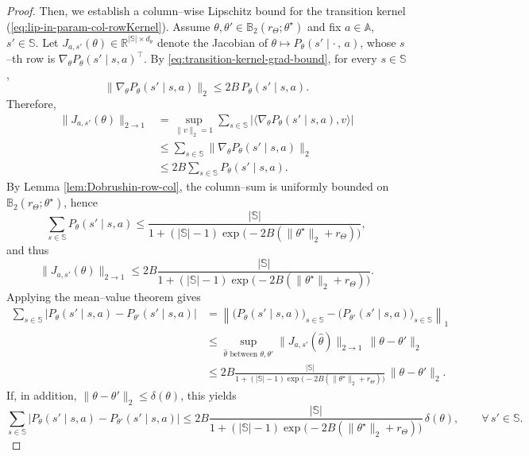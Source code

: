 \documentclass[10pt]{article} %
\theoremstyle{plain}
\theoremstyle{definition}
\theoremstyle{remark}
\newcommand{\bA}{\mathbb{A}}
\newcommand{\bB}{\mathbb{B}}
\newcommand{\bR}{\mathbb{R}}
\newcommand{\bS}{\mathbb{S}}
\begin{document}
\begin{proof}
\medskip
\noindent
Then, we establish a column–wise Lipschitz bound for the transition kernel (\ref{eq:lip-in-param-col-rowKernel}). Assume $\theta,\theta'\in\bB_2(r_\Theta;\theta^\star)$ and fix
$a\in\bA$, $s'\in\bS$. Let $J_{a,s'}(\theta)\in\bR^{|\bS|\times d_\theta}$ denote the Jacobian of $\theta \mapsto P_\theta(s'\mid \cdot\,,\, a)$, whose $s$–th row is
$\nabla_\theta P_\theta(s'\mid s,a)^\top$. By \ref{eq:transition-kernel-grad-bound}, for every $s\in\bS$,
\[
\big\|\nabla_\theta P_\theta(s'\mid s,a)\big\|_2
\le 2B\,P_\theta(s'\mid s,a).
\]
Therefore,
\begin{align*}
\|J_{a,s'}(\theta)\|_{2\to1}
&=\sup_{\|v\|_2=1}
  \sum_{s\in\bS}\big|\langle\nabla_\theta P_\theta(s'\mid s,a),v\rangle\big|\\
&\le \sum_{s\in\bS}\big\|\nabla_\theta P_\theta(s'\mid s,a)\big\|_2\\
&\le 2B\sum_{s\in\bS}P_\theta(s'\mid s,a).
\end{align*}
By Lemma \ref{lem:Dobrushin-row-col}, the column–sum is uniformly bounded on $\bB_2(r_\Theta;\theta^\star)$, hence
\[
\sum_{s\in\bS}P_\theta(s'\mid s,a)
\le
\frac{|\bS|}
{1+(|\bS|-1)\exp\bigl(-2B(\|\theta^\star\|_2+r_\Theta)\bigr)},
\]
and thus
\[
\|J_{a,s'}(\theta)\|_{2\to1}
\le
2B\frac{|\bS|}
{1+(|\bS|-1)\exp\bigl(-2B(\|\theta^\star\|_2+r_\Theta)\bigr)}.
\]
Applying the mean–value theorem gives
\begin{align*}
\sum_{s\in\bS}\big|P_\theta(s'\mid s,a)-P_{\theta'}(s'\mid s,a)\big|
&=\left\|\big(P_\theta(s'\mid s,a)\big)_{s\in\bS}
-\big(P_{\theta'}(s'\mid s,a)\big)_{s\in\bS}
\right\|_1\\
&\le \sup_{\hat\theta\text{ between }\theta,\theta'}
\|J_{a,s'}(\hat\theta)\|_{2\to1}\,\|\theta-\theta'\|_2\\
&\le
2B\frac{|\bS|}
{1+(|\bS|-1)\exp\bigl(-2B(\|\theta^\star\|_2+r_\Theta)\bigr)}
\,\|\theta-\theta'\|_2.
\end{align*}
If, in addition, $\|\theta-\theta'\|_2\le\delta(\theta)$, this yields
\[
\sum_{s\in\bS}\big|P_\theta(s'\mid s,a)-P_{\theta'}(s'\mid s,a)\big|
\le
2B\frac{|\bS|}
{1+(|\bS|-1)\exp\bigl(-2B(\|\theta^\star\|_2+r_\Theta)\bigr)}
\,\delta(\theta),
\qquad\forall\,s'\in\bS.
\]


\end{proof}
\end{document}
